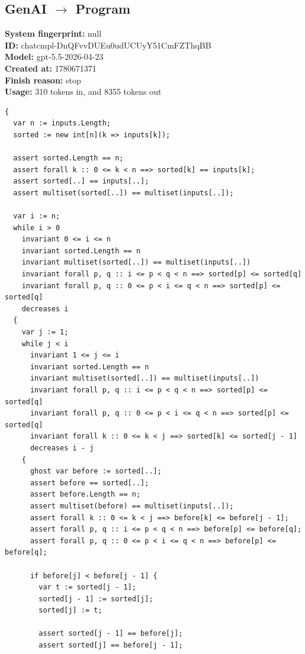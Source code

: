 \documentclass{article}
\begin{document}
\subsection*{GenAI $\rightarrow$ Program}
\textbf{System fingerprint: }null
\\\textbf{ID: }chatcmpl-DnQFvvDUEu0udUCUyY51CmFZThqBB
\\\textbf{Model: }gpt-5.5-2026-04-23
\\\textbf{Created at: }1780671371
\\\textbf{Finish reason: }stop
\\\textbf{Usage: }310 tokens in, and 8355 tokens out
\begin{lstlisting}
{
  var n := inputs.Length;
  sorted := new int[n](k => inputs[k]);

  assert sorted.Length == n;
  assert forall k :: 0 <= k < n ==> sorted[k] == inputs[k];
  assert sorted[..] == inputs[..];
  assert multiset(sorted[..]) == multiset(inputs[..]);

  var i := n;
  while i > 0
    invariant 0 <= i <= n
    invariant sorted.Length == n
    invariant multiset(sorted[..]) == multiset(inputs[..])
    invariant forall p, q :: i <= p < q < n ==> sorted[p] <= sorted[q]
    invariant forall p, q :: 0 <= p < i <= q < n ==> sorted[p] <= sorted[q]
    decreases i
  {
    var j := 1;
    while j < i
      invariant 1 <= j <= i
      invariant sorted.Length == n
      invariant multiset(sorted[..]) == multiset(inputs[..])
      invariant forall p, q :: i <= p < q < n ==> sorted[p] <= sorted[q]
      invariant forall p, q :: 0 <= p < i <= q < n ==> sorted[p] <= sorted[q]
      invariant forall k :: 0 <= k < j ==> sorted[k] <= sorted[j - 1]
      decreases i - j
    {
      ghost var before := sorted[..];
      assert before == sorted[..];
      assert before.Length == n;
      assert multiset(before) == multiset(inputs[..]);
      assert forall k :: 0 <= k < j ==> before[k] <= before[j - 1];
      assert forall p, q :: i <= p < q < n ==> before[p] <= before[q];
      assert forall p, q :: 0 <= p < i <= q < n ==> before[p] <= before[q];

      if before[j] < before[j - 1] {
        var t := sorted[j - 1];
        sorted[j - 1] := sorted[j];
        sorted[j] := t;

        assert sorted[j - 1] == before[j];
        assert sorted[j] == before[j - 1];


\end{lstlisting}
\end{document}
